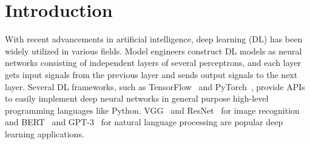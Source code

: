 \section{Introduction}\label{sec:intro}

With recent advancements in artificial intelligence, deep learning (DL) has
been widely utilized in various fields.
Model engineers construct DL models as neural networks consisting of independent
layers of several perceptrons, and each layer gets input signals from the
previous layer and sends output signals to the next layer.
Several DL frameworks, such as TensorFlow~\cite{abadi2016tensorflow} and
PyTorch~\cite{pytorch2019}, provide APIs to easily implement deep neural
networks in general purpose high-level programming languages like Python.
VGG~\cite{simonyan2014very} and ResNet~\cite{he2016deep} for image recognition and
BERT~\cite{bert2018} and GPT-3~\cite{gpt32020} for natural language processing
are popular deep learning applications.



